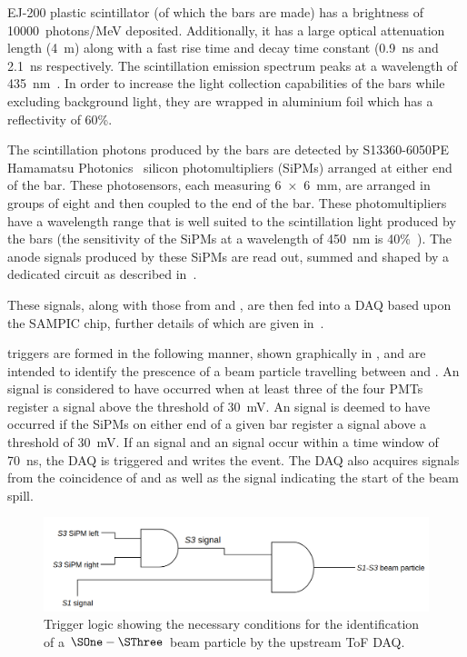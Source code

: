 EJ-200 plastic scintillator (of which the bars are made) has a brightness of \num{10000}~photons/MeV deposited.
Additionally, it has a large optical attenuation length (\SI{4}{\metre}) along with a fast rise time and decay time constant (\SI{0.9}{\nano\second} and \SI{2.1}{\nano\second} respectively.
The scintillation emission spectrum peaks at a wavelength of \SI{435}{\nano\metre}~\cite{ej200}.
In order to increase the light collection capabilities of the bars while excluding background light, they are wrapped in aluminium foil which has a reflectivity of 60\%.

The scintillation photons produced by the bars are detected by S13360-6050PE Hamamatsu Photonics~\cite{hamamatsu} silicon photomultipliers (SiPMs) arranged at either end of the bar.
These photosensors, each measuring \SI{6 x 6}{\milli\metre}, are arranged in groups of eight and then coupled to the end of the bar.
These photomultipliers have a wavelength range that is well suited to the scintillation light produced by the bars (the sensitivity of the SiPMs at a wavelength of \SI{450}{\nano\metre} is 40\%~\cite{hamamatsu}).
The anode signals produced by these SiPMs are read out, summed and shaped by a dedicated circuit as described in~\cite{s3SiPM}.

These signals, along with those from \SOne and \STwo, are then fed into a DAQ based upon the SAMPIC chip, further details of which are given in~\cite{sampic}.

\SThree triggers are formed in the following manner, shown graphically in , and are intended to identify the prescence of a beam particle travelling between \SOne and \SThree.
An \SOne signal is considered to have occurred when at least three of the four \SOne PMTs register a signal above the threshold of \SI{30}{\milli\volt}.
An \SThree signal is deemed to have occurred if the SiPMs on either end of a given bar register a signal above a threshold of \SI{30}{\milli\volt}.
If an \SOne signal and an \SThree signal occur within a time window of \SI{70}{\nano\second}, the DAQ is triggered and writes the event.
The DAQ also acquires signals from the coincidence of \SOne and \STwo as well as the signal indicating the start of the beam spill.

\begin{figure}[h]
  \centering
  \includegraphics[width=.8\linewidth]{files/figures/hptpc_beam_flux/utofTrig}
  \caption[Trigger logic for the upstream time of flight DAQ]{Trigger logic showing the necessary conditions for the identification of a $\SOne-\SThree$ beam particle by the upstream ToF DAQ.}
  \label{fig:s3Trigger}
\end{figure}


